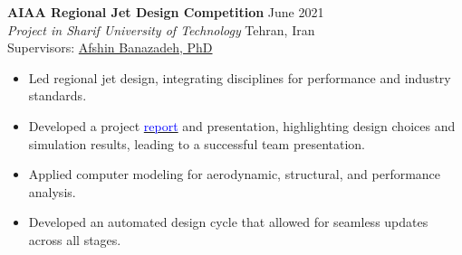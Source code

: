 \documentclass[12pt]{article}
\begin{document}
\noindent
{\textbf{AIAA Regional Jet Design Competition}
\href{https://github.com/alibaniasad1999/Airplane-Design-II}{\faGithub}
}
\hfill June 2021 \\[2pt]
\noindent \textit{Project in Sharif University of Technology
} \hfill Tehran, Iran \\[2pt]
\noindent Supervisors:
\href{http://ae.sharif.edu/~portal/faculty/1014037799}{Afshin Banazadeh, PhD}
\vspace{-4pt}
\begin{itemize}  \itemsep 1pt %
    \item Led regional jet design, integrating  disciplines for {performance} and {industry standards}.
	\item Developed a project \href{https://drive.google.com/drive/folders/1nyzjUDzIgUuoJlB1KRaJeTH69p20cMUK?usp=sharing}{\textcolor{blue}{report}} and presentation, highlighting {design choices} and simulation results, leading to a successful team presentation.
    \item Applied {computer modeling}  for aerodynamic, structural, and performance analysis.
    \item Developed an {automated design cycle} that allowed for seamless updates across all stages.
\end{itemize}
\end{document}
